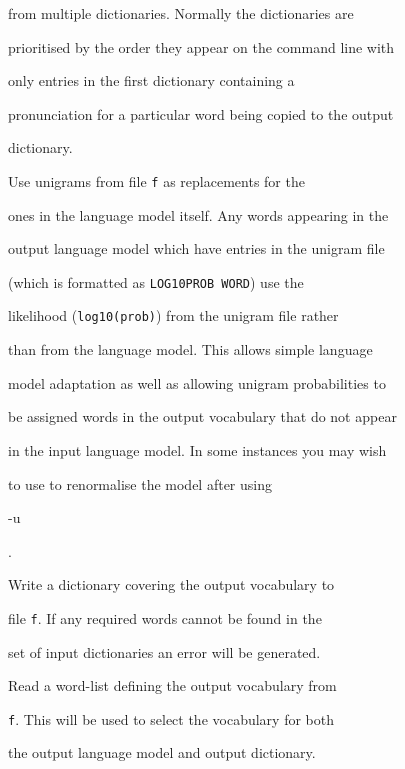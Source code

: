 \begin{optlist}
	from multiple dictionaries.  Normally the dictionaries are


	prioritised by the order they appear on the command line with


	only entries in the first dictionary containing a


	pronunciation for a particular word being copied to the output


	dictionary.





   Use unigrams from file {\tt f} as replacements for the


	ones in the language model itself.  Any words appearing in the


	output language model which have entries in the unigram file


	(which is formatted as {\tt LOG10PROB WORD}) use the


	likelihood ({\tt log10(prob)}) from the unigram file rather


	than from the language model.  This allows simple language


	model adaptation as well as allowing unigram probabilities to


	be assigned words in the output vocabulary that do not appear


	in the input language model.  In some instances you may wish


	to use  to renormalise the model after using {\tt


	-u}.





    Write a dictionary covering the output vocabulary to


	file {\tt f}.  If any required words cannot be found in the


	set of input dictionaries an error will be generated.





   Read a word-list defining the output vocabulary from


	{\tt f}. This will be used to select the vocabulary for both


	the output language model and output dictionary.





\end{optlist}


